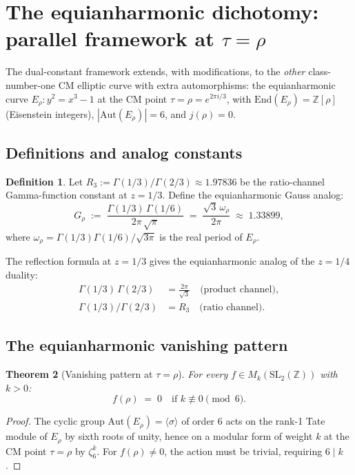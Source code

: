 \documentclass[11pt]{article}
\newtheorem{theorem}{Theorem}[section]
\theoremstyle{definition}
\newtheorem{definition}[theorem]{Definition}
\theoremstyle{remark}
\newcommand{\Z}{\mathbb{Z}}
\newcommand{\Aut}{\mathrm{Aut}}
\begin{document}
\section{The equianharmonic dichotomy: parallel framework at $\tau = \rho$}\label{sec:equianharmonic}

The dual-constant framework extends, with modifications, to the
\emph{other} class-number-one CM elliptic curve with extra automorphisms:
the equianharmonic curve $E_\rho: y^2 = x^3 - 1$ at the CM point
$\tau = \rho = e^{2\pi i/3}$, with $\mathrm{End}(E_\rho) = \Z[\rho]$ (Eisenstein
integers), $|\Aut(E_\rho)| = 6$, and $j(\rho) = 0$.

\subsection{Definitions and analog constants}

\begin{definition}
Let $R_3 := \Gamma(1/3)/\Gamma(2/3) \approx 1.97836$ be the
ratio-channel Gamma-function constant at $z = 1/3$. Define the
equianharmonic Gauss analog:
\[
G_\rho \;:=\; \frac{\Gamma(1/3)\,\Gamma(1/6)}{2\pi\,\sqrt\pi} \;=\; \frac{\sqrt{3}\,\omega_\rho}{2\pi} \;\approx\; 1.33899,
\]
where $\omega_\rho = \Gamma(1/3)\Gamma(1/6)/\sqrt{3\pi}$ is the real period
of $E_\rho$.
\end{definition}

The reflection formula at $z = 1/3$ gives the equianharmonic analog of
the $z = 1/4$ duality:
\begin{align}
\Gamma(1/3)\,\Gamma(2/3) &= \frac{2\pi}{\sqrt 3} \quad\text{(product channel)}, \\
\Gamma(1/3)/\Gamma(2/3) &= R_3 \quad\text{(ratio channel)}.
\end{align}

\subsection{The equianharmonic vanishing pattern}

\begin{theorem}[Vanishing pattern at $\tau = \rho$]\label{thm:rho-vanishing}
For every $f \in M_k(\mathrm{SL}_2(\Z))$ with $k > 0$:
\[
f(\rho) \;=\; 0 \quad \text{if } k \not\equiv 0 \pmod 6.
\]
\end{theorem}

\begin{proof}
The cyclic group $\Aut(E_\rho) = \langle \sigma \rangle$ of order 6 acts on
the rank-1 Tate module of $E_\rho$ by sixth roots of unity, hence on a
modular form of weight $k$ at the CM point $\tau = \rho$ by $\zeta_6^k$.
For $f(\rho) \neq 0$, the action must be trivial, requiring $6 \mid k$.
\end{proof}
\end{document}
